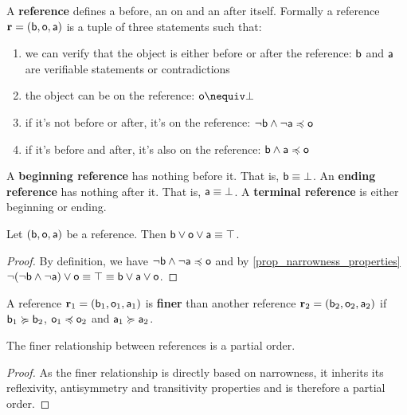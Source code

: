 \documentclass[11pt,letterpaper,fleqn]{memoir} %
\begin{document}
\begin{mathSection}
\begin{defn}
	A \textbf{reference} defines a before, an on and an after itself. Formally a reference $\refStmt = ( \stmt[b], \stmt[o], \stmt[a] )$ is a tuple of three statements such that:
	\begin{enumerate}
		\item we can verify that the object is either before or after the reference: $\stmt[b]$ and $\stmt[a]$ are verifiable statements or contradictions
		\item the object can be on the reference: $\stmt[o] \nequiv \contradiction$
		\item if it's not before or after, it's on the reference: $\NOT \stmt[b] \AND \NOT \stmt[a] \narrower \stmt[o]$
		\item if it's before and after, it's also on the reference: $\stmt[b] \AND \stmt[a] \narrower \stmt[o]$
	\end{enumerate}
A \textbf{beginning reference} has nothing before it. That is, $\stmt[b] \equiv \contradiction$. An \textbf{ending reference} has nothing after it. That is, $\stmt[a] \equiv \contradiction$. A \textbf{terminal reference} is either beginning or ending.
\end{defn}
\begin{coro}
	Let $(\stmt[b], \stmt[o], \stmt[a])$ be a reference. Then $\stmt[b] \OR \stmt[o] \OR \stmt[a] \equiv \tautology$.
\end{coro}
\begin{proof}
	By definition, we have $\NOT \stmt[b] \AND \NOT \stmt[a] \narrower \stmt[o]$ and by \ref{prop_narrowness_properties} $\NOT (\NOT \stmt[b] \AND \NOT \stmt[a]) \OR \stmt[o] \equiv \tautology \equiv \stmt[b] \OR \stmt[a] \OR \stmt[o]$.
\end{proof}
\begin{defn}\label{3_def_reference}
	A reference $\refStmt_1 = (\stmt[b]_1, \stmt[o]_1, \stmt[a]_1)$ is \textbf{finer} than another reference $\refStmt_2 = (\stmt[b]_2, \stmt[o]_2, \stmt[a]_2)$ if $\stmt[b]_1 \broader \stmt[b]_2$, $\stmt[o]_1 \narrower \stmt[o]_2$ and $\stmt[a]_1 \broader \stmt[a]_2$.
\end{defn}
\begin{coro}
	The finer relationship between references is a partial order.
\end{coro}
\begin{proof}
	As the finer relationship is directly based on narrowness, it inherits its reflexivity, antisymmetry and transitivity properties and is therefore a partial order.

\end{proof}
\end{mathSection}
\end{document}
